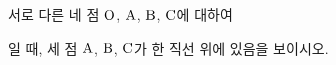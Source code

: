 서로 다른 네 점 $\mathrm{O}$, $\mathrm{A}$, $\mathrm{B}$, $\mathrm{C}$에 대하여 \par\smallskip{}\par\smallskip\noindent 일 때, 세 점 $\mathrm{A}$, $\mathrm{B}$, $\mathrm{C}$가 한 직선 위에 있음을 보이시오.
